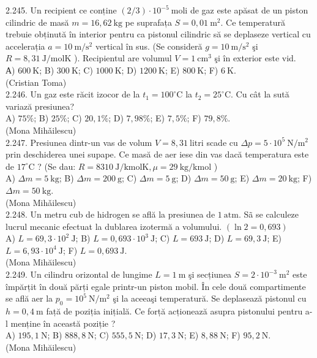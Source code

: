\documentclass[10pt]{article}
\begin{document}
2.245. Un recipient ce conține $(2 / 3) \cdot 10^{-5} \mathrm{~moli}$ de gaz este apăsat de un piston cilindric de masă $m=16,62 \mathrm{~kg}$ pe suprafața $S=0,01 \mathrm{~m}^{2}$. Ce temperatură trebuie obținută în interior pentru ca pistonul cilindric să se deplaseze vertical cu accelerația $a=10 \mathrm{~m} / \mathrm{s}^{2}$ vertical în sus. (Se consideră $g=10 \mathrm{~m} / \mathrm{s}^{2}$ şi $R=8,31 \mathrm{~J} / \mathrm{molK}$ ). Recipientul are volumul $V=1 \mathrm{~cm}^{3}$ şi în exterior este vid.\\ А) $600 \mathrm{~K}$; B) $300 \mathrm{~K}$; C) $1000 \mathrm{~K}$; D) $1200 \mathrm{~K}$; E) $800 \mathrm{~K}$; F) $6 \mathrm{~K}$.\\ (Cristian Toma)\\

2.246. Un gaz este răcit izocor de la $t_{1}=100^{\circ} \mathrm{C}$ la $t_{2}=25^{\circ} \mathrm{C}$. Cu cât la sută variază presiunea?\\ A) $75 \%$; B) $25 \%$; C) $20,1 \%$; D) $7,98 \%$; E) $7,5 \%$; F) $79,8 \%$.\\ (Mona Mihǎilescu)\\

2.247. Presiunea dintr-un vas de volum $V=8,31 \mathrm{~litri}$ scade cu $\Delta p=5 \cdot 10^{5} \mathrm{~N} / \mathrm{m}^{2}$ prin deschiderea unei supape. Ce masă de aer iese din vas dacă temperatura este de $17^{\circ} \mathrm{C}$ ? (Se dau: $R=8310 \mathrm{~J} / \mathrm{kmolK}, \mu=29 \mathrm{~kg} / \mathrm{kmol}$ )\\ A) $\Delta m=5 \mathrm{~kg}$; B) $\Delta m=200 \mathrm{~g}$; C) $\Delta m=5 \mathrm{~g}$; D) $\Delta m=50 \mathrm{~g}$; E) $\Delta m=20 \mathrm{~kg}$; F) $\Delta m=50 \mathrm{~kg}$.\\ (Mona Mihǎilescu)\\

2.248. Un metru cub de hidrogen se află la presiunea de $1 \mathrm{~atm}$. Sã se calculeze lucrul mecanic efectuat la dublarea izotermă a volumului. $(\ln 2=0,693)$\\ A) $L=69,3 \cdot 10^{2} \mathrm{~J}$; B) $L=0,693 \cdot 10^{3} \mathrm{~J}$; C) $L=693 \mathrm{~J}$; D) $L=69,3 \mathrm{~J}$; E) $L=6,93 \cdot 10^{4} \mathrm{~J}$; F) $L=0,693 \mathrm{~J}$.\\ (Mona Mihăilescu)\\

2.249. Un cilindru orizontal de lungime $L=1 \mathrm{~m}$ şi secțiunea $S=2 \cdot 10^{-3} \mathrm{~m}^{2}$ este împărțit în două părți egale printr-un piston mobil. În cele două compartimente se află aer la $p_{0}=10^{5} \mathrm{~N} / \mathrm{m}^{2}$ şi la aceeaşi temperatură. Se deplasează pistonul cu $h=0,4 \mathrm{~m}$ față de poziția inițială. Ce forță acționează asupra pistonului pentru a-l menține în această poziție ?\\ A) $195,1 \mathrm{~N}$; B) $888,8 \mathrm{~N}$; C) $555,5 \mathrm{~N}$; D) $17,3 \mathrm{~N}$; E) $8,88 \mathrm{~N}$; F) $95,2 \mathrm{~N}$.\\ (Mona Mihăilescu)\\
\end{document}
